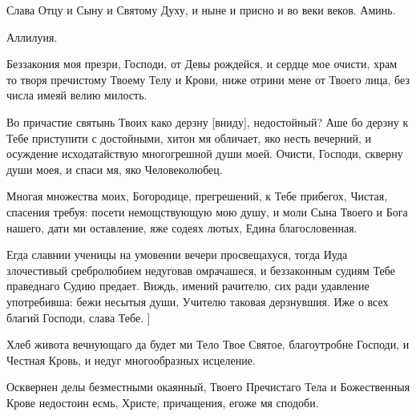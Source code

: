 \begin{mymulticols}
Слава Отцу и Сыну и Святому Духу, и ныне и присно и во веки веков. Аминь.

Аллилуия. 


Беззакония моя презри, Господи, от Девы рождейся, и сердце мое очисти, храм то творя пречистому Твоему Телу и Крови, ниже отрини мене от Твоего лица, без числа имеяй велию милость.

\slava

Во причастие святынь Твоих како дерзну [вниду], недостойный? Аше бо дерзну к Тебе приступити с достойными, хитон мя обличает, яко несть вечерний, и осуждение исходатайствую многогрешной души моей. Очисти, Господи, скверну души моея, и спаси мя, яко Человеколюбец.

\inyne

Многая множества моих, Богородице, прегрешений, к Тебе прибегох, Чистая, спасения требуя: посети немощствующую мою душу, и моли Сына Твоего и Бога нашего, дати ми оставление, яже содеях лютых, Едина благословенная.

\mysubtitle{[Во Святую же Четыредесятницу:}

Егда славнии ученицы на умовении вечери просвещахуся, тогда Иуда злочестивый сребролюбием недуговав омрачашеся, и беззаконным судиям Тебе праведнаго Судию предает. Виждь, имений рачителю, сих ради удавление употребивша: бежи несытыя души, Учителю таковая дерзнувшия. Иже о всех благий Господи, слава Тебе. ]


\PsalmFifty





Хлеб живота вечнующаго да будет ми Тело Твое Святое, благоутробне Господи, и Честная Кровь, и недуг многообразных исцеление.


Осквернен делы безместными окаянный, Твоего Пречистаго Тела и Божественныя Крове недостоин есмь, Христе, причащения, егоже мя сподоби.



\end{mymulticols}
